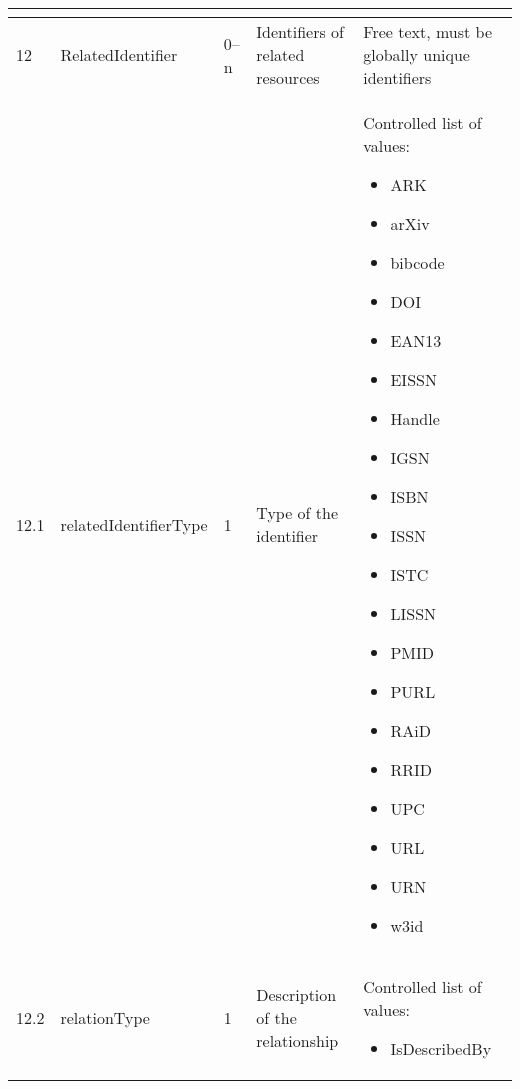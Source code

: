 \documentclass[titlepage=true,twoside=false,DIV=13]{scrartcl}
\begin{document}
\begin{longtable}{|l|l|l|p{}|p{\valcolw}|}
\begin{minipage}[t]{\valcolw}
\begin{itemize}[nosep,leftmargin=3.5ex]
            \end{itemize}
            \vspace{1ex}
          \end{minipage} \\
  \hline
  12    & RelatedIdentifier            & 0--n
        & Identifiers of related resources
        & Free text, must be globally unique identifiers \\
  \hline
  12.1  & relatedIdentifierType        & 1
        & Type of the identifier
        & \begin{minipage}[t]{\valcolw}
            Controlled list of values:
            \begin{itemize}[nosep,leftmargin=3.5ex]
            \item ARK
            \item arXiv
            \item bibcode
            \item DOI
            \item EAN13
            \item EISSN
            \item Handle
            \item IGSN
            \item ISBN
            \item ISSN
            \item ISTC
            \item LISSN
            \item PMID
            \item PURL
            \item RAiD
            \item RRID
            \item UPC
            \item URL
            \item URN
            \item w3id
            \end{itemize}
            \vspace{1ex}
          \end{minipage} \\
  \hline
  12.2  & relationType                 & 1
        & Description of the relationship
        & \begin{minipage}[t]{\valcolw}
            Controlled list of values:
            \begin{itemize}[nosep,leftmargin=3.5ex]
            \item IsDescribedBy

\end{itemize}
\end{minipage}
\end{longtable}
\end{document}
